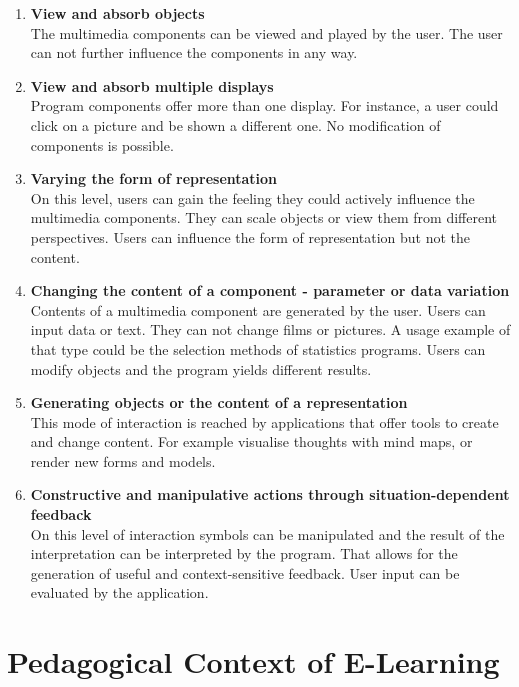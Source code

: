 \begin{enumerate}
\item \textbf{View and absorb objects} \\
      The multimedia components can be viewed and played by the user.
      The user can not further influence the components in any way.
\item \textbf{View and absorb multiple displays} \\
      Program components offer more than one display. For instance, a user
      could click on a picture and be shown a different one.
      No modification of components is possible.
\item \textbf{Varying the form of representation} \\
      On this level, users can gain the feeling they could actively influence
      the multimedia components. They can scale objects or view them from
      different perspectives. Users can influence the form of representation
      but not the content.
\item \label{elearn:class:changingcontent}
      \textbf{Changing the content of a component - parameter or data 
      variation} \\
      Contents of a multimedia component are generated by the user. Users can
      input data or text. They can not change films or pictures.
      A usage example of that type could be the selection methods of statistics
      programs. Users can modify objects and the program yields different 
      results.
\item \label{elearn:class:generateobjects}
      \textbf{Generating objects or the content of a representation} \\
      This mode of interaction is reached by applications that offer tools to
      create and change content. For example visualise thoughts with mind maps,
      or render new forms and models.
\item \label{elearn:class:constructivemanipulative}
      \textbf{Constructive and manipulative actions through 
      situation-dependent feedback} \\
      On this level of interaction symbols can be manipulated and the result of
      the interpretation can be interpreted by the program.
      That allows for the generation of useful and context-sensitive feedback.
      User input can be evaluated by the application.
\end{enumerate}


\section{Pedagogical Context of E-Learning}
\label{sec:elearn:pedagogicalcontext}

